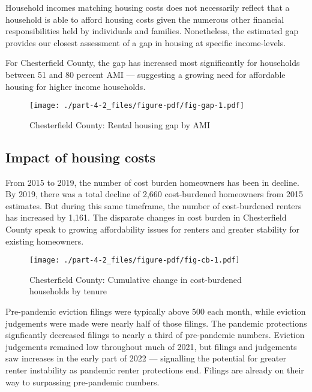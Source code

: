 \documentclass[
  letterpaper,
  DIV=11,
  numbers=noendperiod]{scrreprt}
\begin{document}
Household incomes matching housing costs does not necessarily reflect
that a household is able to afford housing costs given the numerous
other financial responsibilities held by individuals and families.
Nonetheless, the estimated gap provides our closest assessment of a gap
in housing at specific income-levels.

For Chesterfield County, the gap has increased most significantly for
households between 51 and 80 percent AMI --- suggesting a growing need
for affordable housing for higher income households.

\begin{figure}

{\centering \texttt{[image: ./part-4-2\_files/figure-pdf/fig-gap-1.pdf]}

}

\caption{\label{fig-gap}Chesterfield County: Rental housing gap by AMI}

\end{figure}

\hypertarget{impact-of-housing-costs-1}{%
\subsection{Impact of housing costs}\label{impact-of-housing-costs-1}}

From 2015 to 2019, the number of cost burden homeowners has been in
decline. By 2019, there was a total decline of 2,660 cost-burdened
homeowners from 2015 estimates. But during this same timeframe, the
number of cost-burdened renters has increased by 1,161. The disparate
changes in cost burden in Chesterfield County speak to growing
affordability issues for renters and greater stability for existing
homeowners.

\begin{figure}

{\centering \texttt{[image: ./part-4-2\_files/figure-pdf/fig-cb-1.pdf]}

}

\caption{\label{fig-cb}Chesterfield County: Cumulative change in
cost-burdened households by tenure}

\end{figure}

Pre-pandemic eviction filings were typically above 500 each month, while
eviction judgements were made were nearly half of those filings. The
pandemic protections signficantly decreased filings to nearly a third of
pre-pandemic numbers. Eviction judgements remained low throughout much
of 2021, but filings and judgements saw increases in the early part of
2022 --- signalling the potential for greater renter instability as
pandemic renter protections end. Filings are already on their way to
surpassing pre-pandemic numbers.
\end{document}
